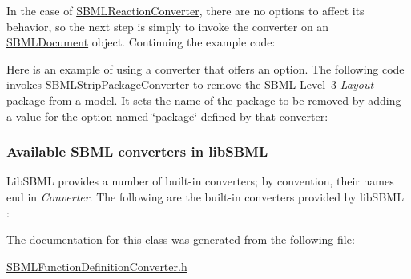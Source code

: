 In the case of \hyperlink{class_s_b_m_l_reaction_converter}{S\+B\+M\+L\+Reaction\+Converter}, there are no options to affect its behavior, so the next step is simply to invoke the converter on an \hyperlink{class_s_b_m_l_document}{S\+B\+M\+L\+Document} object. Continuing the example code\+:

Here is an example of using a converter that offers an option. The following code invokes \hyperlink{class_s_b_m_l_strip_package_converter}{S\+B\+M\+L\+Strip\+Package\+Converter} to remove the S\+B\+ML Level~3 {\itshape Layout} package from a model. It sets the name of the package to be removed by adding a value for the option named {\ttfamily \char`\"{}package\char`\"{}} defined by that converter\+:\hypertarget{classdoc__section__using__sbml__converters_available-converters}{}\subsubsection{Available S\+B\+M\+L converters in lib\+S\+B\+ML}\label{classdoc__section__using__sbml__converters_available-converters}
Lib\+S\+B\+ML provides a number of built-\/in converters; by convention, their names end in {\itshape Converter}. The following are the built-\/in converters provided by lib\+S\+B\+ML \+:

The documentation for this class was generated from the following file\+:\begin{DoxyCompactItemize}
\item 
\hyperlink{_s_b_m_l_function_definition_converter_8h}{S\+B\+M\+L\+Function\+Definition\+Converter.\+h}\end{DoxyCompactItemize}
